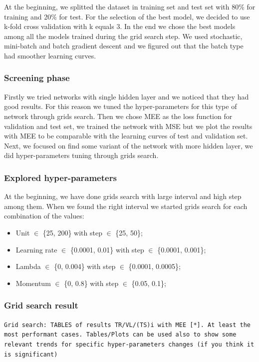 At the beginning, we splitted the dataset in training set and test set with 80\% for training and 20\% for test. For the selection of the best model, we decided to use k-fold cross validation with k equals 3. In the end we chose the best models among all the models trained during the grid search step. We used stochastic, mini-batch and batch gradient descent and we figured out that the batch type had smoother learning curves.

\subsubsection{Screening phase}

Firstly we tried networks with single hidden layer and we noticed that they had good results. For this reason we tuned the hyper-parameters for this type of network through grids search.
Then we chose MEE as the loss function for validation and test set, we trained the network with MSE but we plot the results with MEE to be comparable with the learning curves of test and validation set.
Next, we focused on find some variant of the network with more hidden layer, we did hyper-parameters tuning through grids search.

\subsubsection{Explored hyper-parameters}
At the beginning, we have done grids search with large interval and high step among them. When we found the right interval we started grids search for each combination of the values:

\begin{itemize}
	\item Unit $\in$ \{25, 200\} with step $\in$ \{25, 50\};
	\item Learning rate $\in$ \{0.0001, 0.01\} with step $\in$ \{0.0001, 0.001\};
	\item Lambda $\in$ \{0, 0.004\} with step $\in$ \{0.0001,  0.0005\};
	\item Momentum $\in$ \{0, 0.8\} with step $\in$ \{0.05,  0.1\};
\end{itemize}


\subsubsection{Grid search result}
\texttt{Grid search: TABLES of results TR/VL/(TS)i with  MEE [*]. At least the most performant cases. Tables/Plots can be used also to show some relevant trends for specific hyper-parameters changes (if you think it is significant) }
